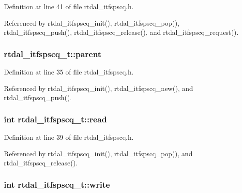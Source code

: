 Definition at line 41 of file rtdal\-\_\-itfspscq.\-h.



Referenced by rtdal\-\_\-itfspscq\-\_\-init(), rtdal\-\_\-itfspscq\-\_\-pop(), rtdal\-\_\-itfspscq\-\_\-push(), rtdal\-\_\-itfspscq\-\_\-release(), and rtdal\-\_\-itfspscq\-\_\-request().

\hypertarget{structrtdal__itfspscq__t_aed92982a615adbe1ae3d1e149faf382f}{
\subsubsection[{parent}]{ rtdal\-\_\-itfspscq\-\_\-t\-::parent}}\label{structrtdal__itfspscq__t_aed92982a615adbe1ae3d1e149faf382f}


Definition at line 35 of file rtdal\-\_\-itfspscq.\-h.



Referenced by rtdal\-\_\-itfspscq\-\_\-init(), rtdal\-\_\-itfspscq\-\_\-new(), and rtdal\-\_\-itfspscq\-\_\-push().

\hypertarget{structrtdal__itfspscq__t_a8c184b2163d17ecbe3ebb4190314e427}{
\subsubsection[{read}]{\setlength{\rightskip}{0pt plus 5cm}int rtdal\-\_\-itfspscq\-\_\-t\-::read}}\label{structrtdal__itfspscq__t_a8c184b2163d17ecbe3ebb4190314e427}


Definition at line 39 of file rtdal\-\_\-itfspscq.\-h.



Referenced by rtdal\-\_\-itfspscq\-\_\-init(), rtdal\-\_\-itfspscq\-\_\-pop(), and rtdal\-\_\-itfspscq\-\_\-release().

\hypertarget{structrtdal__itfspscq__t_a41d853b973164484c80ee9125e4178d1}{
\subsubsection[{write}]{\setlength{\rightskip}{0pt plus 5cm}int rtdal\-\_\-itfspscq\-\_\-t\-::write}}\label{structrtdal__itfspscq__t_a41d853b973164484c80ee9125e4178d1}



